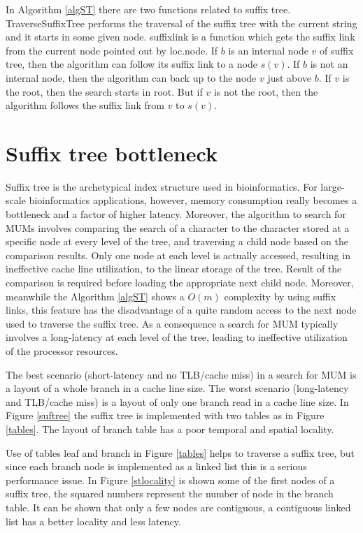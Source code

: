 \documentclass[conference]{IEEEtran}
\begin{document}
In Algorithm \ref{algST} there are two functions related to suffix tree. TraverseSuffixTree performs the traversal of the suffix tree with the current string  and it starts in some given node. suffixlink is a function which gets the suffix link from the current node pointed out by loc.node. If $b$ is an internal node $v$ of suffix tree, then the algorithm can follow its suffix link to a node $s(v)$. If $b$ is not an internal node, then the algorithm can back up to the node $v$ just above $b$. If $v$ is the root, then the search starts in root. But if $v$ is not the root, then the algorithm follows the suffix link from $v$ to $s(v)$.

\section{Suffix tree bottleneck}
\label{bottleneck}
Suffix tree is the archetypical index structure used in bioinformatics. For large-scale bioinformatics applications, however, memory consumption really becomes a bottleneck and a factor of higher latency. Moreover, the algorithm to search for MUMs involves comparing the search of a character to the character stored at a specific node at every level of the tree, and traversing a child node based on the comparison results. Only one node at each level is actually accessed, resulting in ineffective cache line utilization, to the linear storage of the tree. Result of the comparison is required before loading the appropriate next child node. Moreover, meanwhile the Algorithm \ref{algST} shows a $O(m)$ complexity by using suffix links, this feature has the disadvantage of a quite random access to the next node used to traverse the suffix tree. As a consequence a search for MUM typically involves a long-latency at each level of the tree, leading to ineffective utilization of the processor resources.

The best scenario (short-latency and no TLB/cache miss) in a search for MUM is a layout of a whole branch in a cache line size. The worst scenario (long-latency and TLB/cache miss) is a layout of only one branch read in a cache line size. In Figure \ref{suftree} the suffix tree is implemented with two tables as in Figure \ref{tables}. The layout of branch table has a poor temporal and spatial locality. 

Use of tables leaf and branch in Figure \ref{tables} helps to traverse a suffix tree, but since each branch node is implemented as a linked list this is a serious performance issue. In Figure \ref{stlocality} is shown some of the first nodes of a suffix tree, the squared numbers represent the number of node in the branch table. It can be shown that only a few nodes are contiguous, a contiguous linked list has a better locality and less latency.
 
\end{document}
